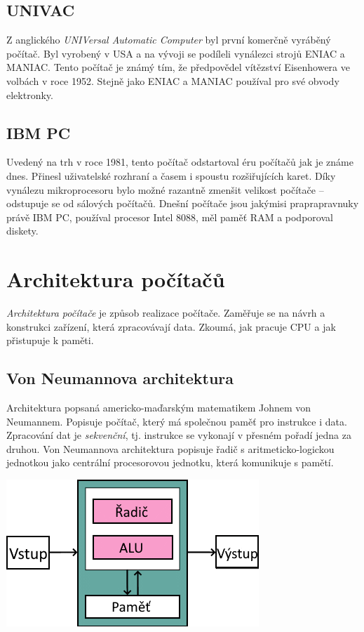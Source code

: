 \documentclass[a4paper]{article}
\begin{document}
    \subsection{UNIVAC}
        Z anglického \textit{UNIVersal Automatic Computer} byl první komerčně vyráběný počítač. Byl vyrobený v USA a na vývoji se podíleli vynálezci strojů ENIAC a MANIAC. Tento počítač je známý tím, že předpovědel vítězství Eisenhowera ve volbách v roce 1952. Stejně jako ENIAC a MANIAC používal pro své obvody elektronky.
    \subsection{IBM PC}
        Uvedený na trh v roce 1981, tento počítač odstartoval éru počítačů jak je známe dnes. Přinesl uživatelské rozhraní a časem i spoustu rozšiřujících karet. Díky vynálezu mikroprocesoru bylo možné razantně zmenšit velikost počítače -- odstupuje se od sálových počítačů. Dnešní počítače jsou jakýmisi praprapravnuky právě IBM PC, používal procesor Intel 8088, měl paměť RAM a podporoval diskety.

\newpage


\section{Architektura počítačů}
    \textit{Architektura počítače} je způsob realizace počítače. Zaměřuje se na návrh a konstrukci zařízení, která zpracovávají data. Zkoumá, jak pracuje CPU a jak přistupuje k paměti.
    \subsection{Von Neumannova architektura}
        Architektura popsaná americko-maďarským matematikem Johnem von Neumannem. Popisuje počítač, který má společnou paměť pro instrukce i data. Zpracování dat je \textit{sekvenční}, tj. instrukce se vykonají v přesném pořadí jedna za druhou. Von Neumannova architektura  popisuje řadič s aritmeticko-logickou jednotkou jako centrální procesorovou jednotku, která komunikuje s pamětí. \par
        \includegraphics{vonNeumann.png}  
\end{document}
